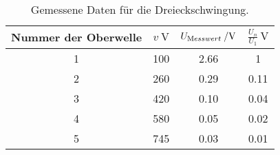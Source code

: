 \begin{table}[H]
  \centering
   \begin{tabular}{c c c c}
    \toprule
    Nummer der Oberwelle & $ v \: \si{\volt}$ & $ U_{\text Messwert}\: / \si{\volt} $ &
    $ \frac{U_{n}}{U_{1}} \: \si{\volt} $  \\
    \midrule
    1 & 100 & 2.66 & 1 \\
    2 & 260 & 0.29 & 0.11 \\
    3 & 420 & 0.10 & 0.04 \\
    4 & 580 & 0.05 & 0.02 \\
    5 & 745 & 0.03 & 0.01 \\
    \bottomrule
  \end{tabular}
  \caption{Gemessene Daten für die Dreieckschwingung.}
  \label{tab:tabe2}
\end{table}

